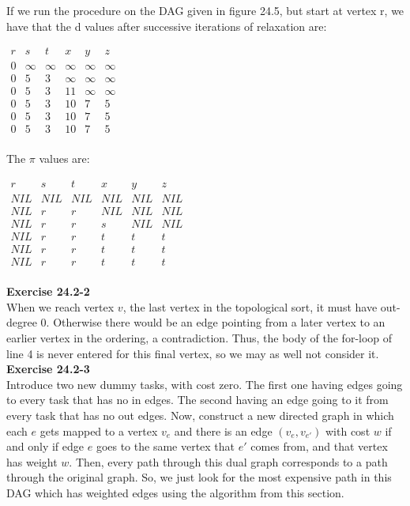 \documentclass{article}
\begin{document}
 If we run the procedure on the DAG given in figure 24.5, but start at vertex r, we have that the d values after successive iterations of relaxation are:

\begin{center}
$
\begin{array}{|c|c|c|c|c|c|}
r&s&t&x&y&z\\
\hline
0&\infty&\infty&\infty&\infty&\infty\\
0&5&3&\infty&\infty&\infty\\
0&5&3&11&\infty&\infty\\
0&5&3&10&7&5\\
0&5&3&10&7&5\\
0&5&3&10&7&5\\
\end{array}
$
\end{center}


The $\pi$ values are:

\begin{center}
$
\begin{array}{|c|c|c|c|c|c|}
r&s&t&x&y&z\\
\hline
NIL&NIL&NIL&NIL&NIL&NIL\\
NIL&r&r&NIL&NIL&NIL\\
NIL&r&r&s&NIL&NIL\\
NIL&r&r&t&t&t\\
NIL&r&r&t&t&t\\
NIL&r&r&t&t&t\\
\end{array}
$
\end{center}

\noindent\textbf{Exercise 24.2-2}\\

When we reach vertex $v$, the last vertex in the topological sort, it must have out-degree 0.  Otherwise there would be an edge pointing from a later vertex to an earlier vertex in the ordering, a contradiction. Thus, the body of the for-loop of line 4 is never entered for this final vertex, so we may as well not consider it. \\


\noindent\textbf{Exercise 24.2-3}\\

Introduce two new dummy tasks, with cost zero. The first one having edges going to every task that has no in edges. The second having an edge going to it from every task that has no out edges. Now, construct a new directed graph in which each $e$ gets mapped to a vertex $v_e$ and there is an edge $(v_e,v_{e'})$ with cost $w$ if and only if edge $e$ goes to the same vertex that $e'$ comes from, and that vertex has weight $w$. Then, every path through this dual graph corresponds to a path through the original graph. So, we just look for the most expensive path in this DAG which has weighted edges using the algorithm from this section.\\
\end{document}
